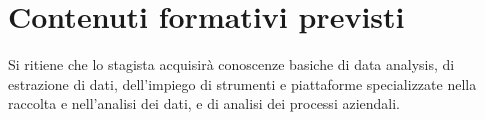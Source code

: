 \section*{Contenuti formativi previsti}
Si ritiene che lo stagista acquisirà conoscenze basiche di data analysis, di estrazione di dati, dell’impiego di strumenti e piattaforme specializzate nella raccolta e nell’analisi dei dati, e di analisi dei processi aziendali.
\newpage